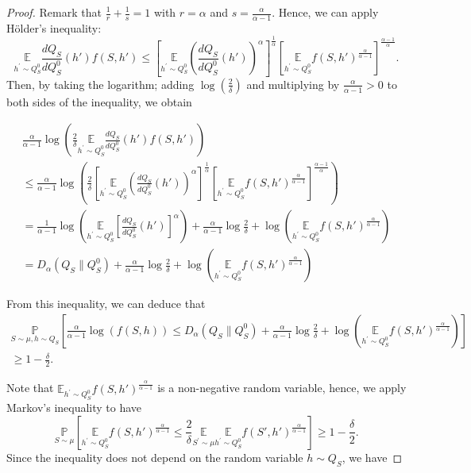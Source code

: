 \begin{proof}[Proof]
Remark that $\frac{1}{r}+\frac{1}{s}=1$ with $r=\alpha$ and $s=\frac{\alpha}{\alpha-1}$. Hence, we can apply Hölder's inequality:
$$
\underset{h^{\prime} \sim Q_S^0}{\mathbb{E}} \frac{dQ_S}{dQ_S^0}(h') f(S,h') \leq\left[\underset{h^{\prime} \sim Q_S^0}{\mathbb{E}}\left(\frac{dQ_S}{dQ_S^0}(h')\right)^{\alpha}\right]^{\frac{1}{\alpha}}\left[\underset{h^{\prime} \sim Q_S^0}{\mathbb{E}} f(S,h')^{\frac{\alpha}{\alpha-1}}\right]^{\frac{\alpha-1}{\alpha}} .
$$
Then, by taking the logarithm; adding $\log \left(\frac{2}{\delta}\right)$ and multiplying by $\frac{\alpha}{\alpha-1}>0$ to both sides of the inequality, we obtain

\begin{multline*}
\frac{\alpha}{\alpha-1} \log \left(\frac{2}{\delta} \underset{h^{\prime} \sim Q_S^0}{\mathbb{E}} \frac{dQ_S}{dQ_S^0}(h') f(S,h')\right) \\
\leq \frac{\alpha}{\alpha-1} \log \left(\frac{2}{\delta}\left[\underset{h^{\prime} \sim Q_S^0}{\mathbb{E}}\left(\frac{dQ_S}{dQ_S^0}(h')\right)^{\alpha}\right]^{\frac{1}{\alpha}}\left[\underset{h^{\prime} \sim Q_S^0}{\mathbb{E}} f(S,h')^{\frac{\alpha}{\alpha-1}}\right]^{\frac{\alpha-1}{\alpha}}\right) \\
 =\frac{1}{\alpha-1} \log \left(\underset{h^{\prime} \sim Q_S^0}{\mathbb{E}}\left[\frac{dQ_S}{dQ_S^0}(h')\right]^{\alpha}\right)+\frac{\alpha}{\alpha-1} \log \frac{2}{\delta}+\log \left(\underset{h^{\prime} \sim Q_S^0}{\mathbb{E}} f(S,h')^{\frac{\alpha}{\alpha-1}}\right) \\
=D_{\alpha}\left(Q_{S} \| Q_S^0\right)+\frac{\alpha}{\alpha-1} \log \frac{2}{\delta}+\log \left(\underset{h^{\prime} \sim Q_S^0}{\mathbb{E}} f(S,h')^{\frac{\alpha}{\alpha-1}}\right)
\end{multline*}

From this inequality, we can deduce that
\begin{multline}
  \label{eq: viallard_dis_eq11}
  \underset{S \sim \mu, h \sim Q_{S}}{\mathbb{P}}\left[\frac{\alpha}{\alpha-1} \log (f(S,h)) \leq D_{\alpha}\left(Q_{S} \| Q_S^0\right)+\frac{\alpha}{\alpha-1} \log \frac{2}{\delta}+\log \left(\underset{h^{\prime} \sim Q_S^0}{\mathbb{E}} f(S,h')^{\frac{\alpha}{\alpha-1}}\right)\right] \\
  \geq 1-\frac{\delta}{2} .
\end{multline}


Note that $\mathbb{E}_{h^{\prime} \sim Q_S^0} f(S,h')^{\frac{\alpha}{\alpha-1}}$ is a non-negative random variable, hence, we apply Markov's inequality to have
$$
\underset{S \sim \mu}{\mathbb{P}}\left[\underset{h^{\prime} \sim Q_S^0}{\mathbb{E}} f(S,h')^{\frac{\alpha}{\alpha-1}} \leq \frac{2}{\delta} \underset{S^{\prime} \sim \mu}{\mathbb{E}} \underset{h^{\prime} \sim Q_S^0}{\mathbb{E}} f(S',h')^{\frac{\alpha}{\alpha-1}}\right] \geq 1-\frac{\delta}{2} .
$$
Since the inequality does not depend on the random variable $h \sim Q_{S}$, we have


\end{proof}
